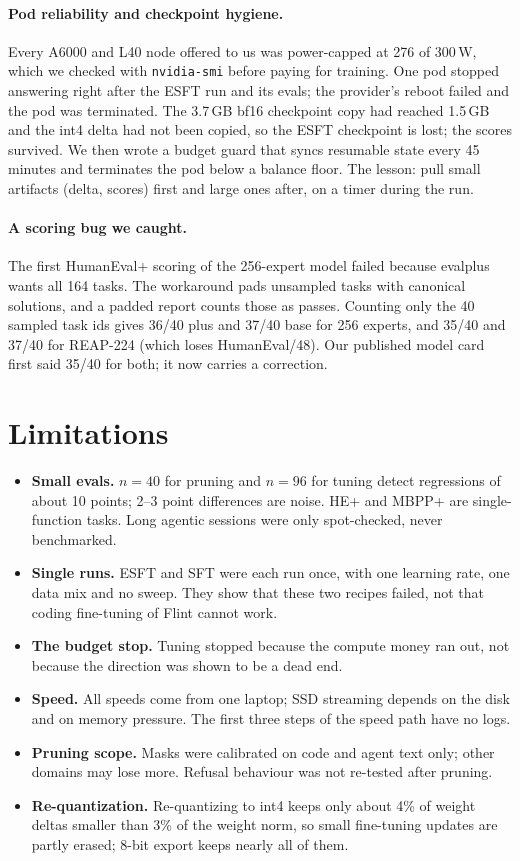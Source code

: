 \documentclass[11pt]{article}
\begin{document}
\paragraph{Pod reliability and checkpoint hygiene.} Every A6000 and L40 node offered to us was power-capped at 276 of
300\,W, which we checked with \texttt{nvidia-smi} before paying for training. One pod stopped answering right after the
ESFT run and its evals; the provider's reboot failed and the pod was terminated. The 3.7\,GB bf16 checkpoint copy had
reached 1.5\,GB and the int4 delta had not been copied, so the ESFT checkpoint is lost; the scores survived. We then
wrote a budget guard that syncs resumable state every 45 minutes and terminates the pod below a balance floor. The
lesson: pull small artifacts (delta, scores) first and large ones after, on a timer during the run.

\paragraph{A scoring bug we caught.} The first HumanEval+ scoring of the 256-expert model failed because evalplus wants
all 164 tasks. The workaround pads unsampled tasks with canonical solutions, and a padded report counts those as passes.
Counting only the 40 sampled task ids gives 36/40 plus and 37/40 base for 256 experts, and 35/40 and 37/40 for REAP-224
(which loses HumanEval/48). Our published model card first said 35/40 for both; it now carries a correction.

\section{Limitations}

\begin{itemize}
  \item \textbf{Small evals.} $n{=}40$ for pruning and $n{=}96$ for tuning detect regressions of about 10 points; 2--3
        point differences are noise. HE+ and MBPP+ are single-function tasks. Long agentic sessions were only
        spot-checked, never benchmarked.
  \item \textbf{Single runs.} ESFT and SFT were each run once, with one learning rate, one data mix and no sweep. They show
        that these two recipes failed, not that coding fine-tuning of Flint cannot work.
  \item \textbf{The budget stop.} Tuning stopped because the compute money ran out, not because the direction was shown
        to be a dead end.
  \item \textbf{Speed.} All speeds come from one laptop; SSD streaming depends on the disk and on memory pressure. The
        first three steps of the speed path have no logs.
  \item \textbf{Pruning scope.} Masks were calibrated on code and agent text only; other domains may lose more. Refusal
        behaviour was not re-tested after pruning.
  \item \textbf{Re-quantization.} Re-quantizing to int4 keeps only about 4\% of weight deltas smaller than 3\% of the
        weight norm, so small fine-tuning updates are partly erased; 8-bit export keeps nearly all of them.
\end{itemize}
\end{document}
